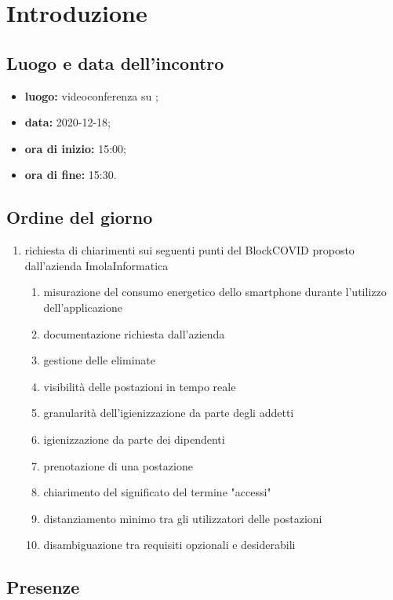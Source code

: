 \section*{Introduzione}

\subsection*{Luogo e data dell'incontro}
\begin{itemize}
	\item \textbf{luogo:} videoconferenza su ;
	\item \textbf{data:} 2020-12-18;
	\item \textbf{ora di inizio:} 15:00;
	\item \textbf{ora di fine:} 15:30.
\end{itemize}

\subsection*{Ordine del giorno}
	\begin{enumerate}
	\item richiesta di chiarimenti sui seguenti punti del  BlockCOVID proposto dall'azienda ImolaInformatica
		\begin{enumerate}
			\item misurazione del consumo energetico dello smartphone durante l'utilizzo dell'applicazione
			\item documentazione richiesta dall'azienda
			\item gestione delle  eliminate
			\item visibilità delle postazioni in tempo reale
			\item granularità dell'igienizzazione da parte degli addetti
			\item igienizzazione da parte dei dipendenti
			\item prenotazione di una postazione
			\item chiarimento del significato del termine "accessi"
			\item distanziamento minimo tra gli utilizzatori delle postazioni
			\item disambiguazione tra requisiti opzionali e desiderabili
		\end{enumerate}
	\end{enumerate}

\subsection*{Presenze}
